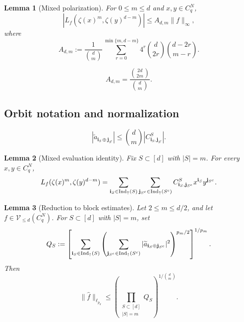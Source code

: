 \documentclass[10pt,a4paper]{amsart}
\newtheorem{lemma}{Lemma}
\newcommand{\Indup}{\textcolor{black}{\operatorname{Ind}_{\uparrow}}}
\begin{document}
\begin{lemma}[Mixed polarization]\label{lem:qary-mixed-polarization}
For $0\leq m\leq d$ and $x,y\in C_q^N$,
\begin{equation}\label{eq:qary-mixed-polarization}
 |L_f(\zeta(x)^m,\zeta(y)^{d-m})|
 \leq A_{d,m}\|f\|_\infty,
\end{equation}
where
\begin{equation}\label{eq:Adm-sum-q}
 A_{d,m}
 :=\frac1{\binom dm}
 \sum_{r=0}^{\min\{m,d-m\}}
 4^r\binom d{2r}\binom{d-2r}{m-r}.
\end{equation}
\end{lemma}

\begin{equation}\label{eq:Adm-exact-q}
 A_{d,m}=\frac{\binom{2d}{2m}}{\binom dm}.
\end{equation}

\subsection{Orbit notation and normalization}\label{sec:orbits}

\begin{equation}\label{eq:atilde-C-bound}
 |\widetilde a_{\mathbf i_S\oplus\mathbf j_{S^c}}|
 \leq\binom dm|C^S_{\mathbf i_S,\mathbf j_{S^c}}|.
\end{equation}

\begin{lemma}[Mixed evaluation identity]\label{lem:mixed-evaluation}
Fix $S\subset[d]$ with $|S|=m$.  For every $x,y\in C_q^N$,
\begin{equation}\label{eq:mixed-evaluation}
 L_f(\zeta(x)^m,\zeta(y)^{d-m})
 =\sum_{\mathbf i_S\in\Indup(S)}
  \sum_{\mathbf j_{S^c}\in\Indup(S^c)}
 C^S_{\mathbf i_S,\mathbf j_{S^c}}x^{\mathbf i_S}y^{\mathbf j_{S^c}}.
\end{equation}
\end{lemma}

\begin{lemma}[Reduction to block estimates]\label{lem:blei-reduction-recurrence}
Let $2\leq m\leq d/2$, and let
$f\in\mathcal V_{\leq d}(C_q^N)$.  For $S\subset[d]$ with $|S|=m$, set
\begin{equation}\label{eq:QS}
 Q_S:=
 \left[
 \sum_{\mathbf i_S\in\Indup(S)}
 \left(
 \sum_{\mathbf j_{S^c}\in\Indup(S^c)}
 |\widetilde a_{\mathbf i_S\oplus\mathbf j_{S^c}}|^2
 \right)^{p_m/2}
 \right]^{1/p_m}.
\end{equation}
Then
\begin{equation}\label{eq:blei-canonical}
 \|\widehat f\|_{\ell_{p_d}}
 \leq
 \left(
 \prod_{\substack{S\subset[d]\\ |S|=m}}Q_S
 \right)^{1/\binom dm}.
\end{equation}
\end{lemma}
\end{document}

